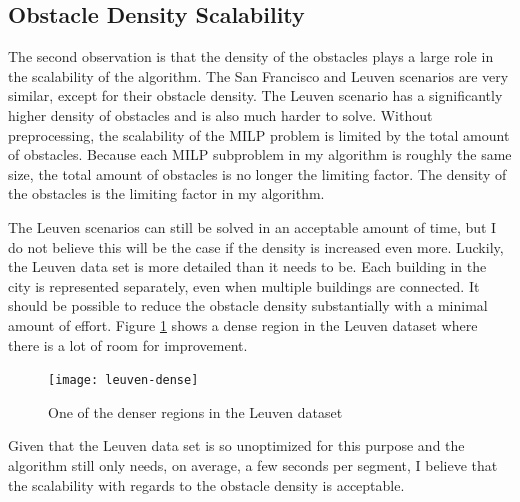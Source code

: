 \subsection{Obstacle Density Scalability}
The second observation is that the density of the obstacles plays a large role in the scalability of the algorithm. The San Francisco and Leuven scenarios are very similar, except for their obstacle density. The Leuven scenario has a significantly higher density of obstacles and is also much harder to solve. Without preprocessing, the scalability of the MILP problem is limited by the total amount of obstacles. Because each MILP subproblem in my algorithm is roughly the same size, the total amount of obstacles is no longer the limiting factor. The density of the obstacles is the limiting factor in my algorithm.
\par
The Leuven scenarios can still be solved in an acceptable amount of time, but I do not believe this will be the case if the density is increased even more. Luckily, the Leuven data set is more detailed than it needs to be. Each building in the city is represented separately, even when multiple buildings are connected. It should be possible to reduce the obstacle density substantially with a minimal amount of effort. Figure \ref{fig:leuven-dense2} shows a dense region in the Leuven dataset where there is a lot of room for improvement.

\begin{figure}[h]
	\centering
	\texttt{[image: leuven-dense]}
	\caption{One of the denser regions in the Leuven dataset}
	\label{fig:leuven-dense2}
\end{figure}

Given that the Leuven data set is so unoptimized for this purpose and the algorithm still only needs, on average, a few seconds per segment, I believe that the scalability with regards to the obstacle density is acceptable.

